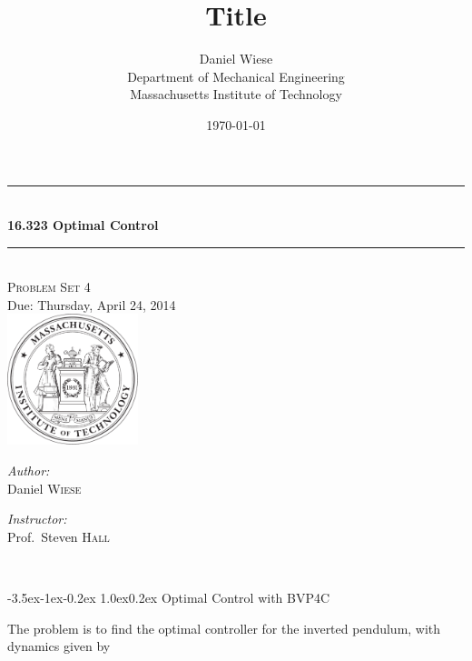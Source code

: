 \documentclass[11pt,letterpaper,onecolumn,notitlepage]{article}
\title{\textbf{Title}}
\author{Daniel Wiese \\ Department of Mechanical Engineering \\ Massachusetts Institute of Technology}
\date{\today}
\makeatletter
\renewcommand\section{\@startsection{section}{1}{\z@}%
{-3.5ex\@plus-1ex\@minus-0.2ex}%
{1.0ex\@plus0.2ex}%
{\fontsize{12pt}{12pt}\selectfont\bfseries\sffamily}}
\makeatother
\begin{document}
  \begin{titlepage}
    \begin{center}
      \rule{\linewidth}{0.01in} \\[0.25in]
      {\huge\bfseries 16.323 Optimal Control}\\[0.4cm]
      \rule{\linewidth}{0.01in} \\[0.25in]

      \textsc{\LARGE Problem Set 4}\\[0.15in]
      \large Due: Thursday, April 24, 2014 \\[1.0in]
      \includegraphics[width=1.5in]{../fig/mit-seal.pdf}\\[3.0in]

      \begin{minipage}{0.4\textwidth}
        \begin{flushleft} \large
          \emph{Author:}\\
          Daniel \textsc{Wiese}
          \vfill
        \end{flushleft}
      \end{minipage}
      \begin{minipage}{0.4\textwidth}
        \begin{flushright} \large
          \emph{Instructor:} \\
          Prof.~Steven \textsc{Hall} \\
        \end{flushright}
      \end{minipage} \\
      \vfill
    \end{center}
  \end{titlepage}

  \clearpage
  \section{Optimal Control with BVP4C}

  The problem is to find the optimal controller for the inverted pendulum, with dynamics given by
\end{document}
